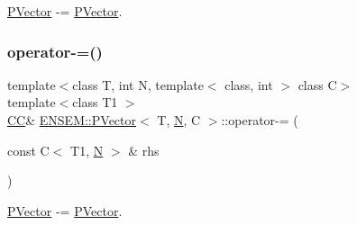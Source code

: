 \mbox{\hyperlink{classENSEM_1_1PVector}{P\+Vector}} -\/= \mbox{\hyperlink{classENSEM_1_1PVector}{P\+Vector}}. 

\mbox{\label{classENSEM_1_1PVector_afe4c144dcca484fed4ee1924d1e387be}} 
\subsubsection{\texorpdfstring{operator-\/=()}{operator-=()}\hspace{0.1cm}{\footnotesize\ttfamily [3/3]}}
{\footnotesize\ttfamily template$<$class T, int N, template$<$ class, int $>$ class C$>$ \\
template$<$class T1 $>$ \\
\mbox{\hyperlink{classENSEM_1_1PVector_a92dc0a0a301a3dc96f7be5d337019bc7}{CC}}\& \mbox{\hyperlink{classENSEM_1_1PVector}{E\+N\+S\+E\+M\+::\+P\+Vector}}$<$ T, \mbox{\hyperlink{adat__devel_2lib_2hadron_2operator__name__util_8cc_a7722c8ecbb62d99aee7ce68b1752f337}{N}}, C $>$\+::operator-\/= (\begin{DoxyParamCaption}\item[{const C$<$ T1, \mbox{\hyperlink{adat__devel_2lib_2hadron_2operator__name__util_8cc_a7722c8ecbb62d99aee7ce68b1752f337}{N}} $>$ \&}]{rhs }\end{DoxyParamCaption})\hspace{0.3cm}{\ttfamily [inline]}}



\mbox{\hyperlink{classENSEM_1_1PVector}{P\+Vector}} -\/= \mbox{\hyperlink{classENSEM_1_1PVector}{P\+Vector}}. 

\mbox{\label{classENSEM_1_1PVector_a0da5cf65327a7044128b9a36a49b94e6}} 
